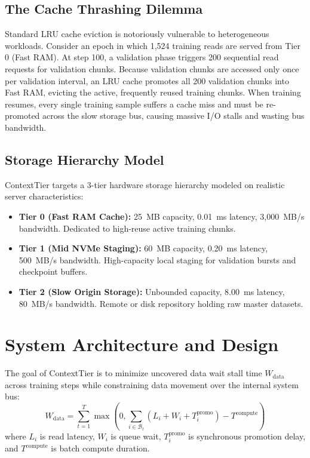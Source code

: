 \documentclass[conference]{IEEEtran}
\begin{document}
\subsection{The Cache Thrashing Dilemma}
Standard LRU cache eviction is notoriously vulnerable to heterogeneous workloads. Consider an epoch in which 1,524 training reads are served from Tier 0 (Fast RAM). At step 100, a validation phase triggers 200 sequential read requests for validation chunks. Because validation chunks are accessed only once per validation interval, an LRU cache promotes all 200 validation chunks into Fast RAM, evicting the active, frequently reused training chunks. When training resumes, every single training sample suffers a cache miss and must be re-promoted across the slow storage bus, causing massive I/O stalls and wasting bus bandwidth.

\subsection{Storage Hierarchy Model}
ContextTier targets a 3-tier hardware storage hierarchy modeled on realistic server characteristics:
\begin{itemize}
    \item \textbf{Tier 0 (Fast RAM Cache):} 25~MB capacity, 0.01~ms latency, 3,000~MB/s bandwidth. Dedicated to high-reuse active training chunks.
    \item \textbf{Tier 1 (Mid NVMe Staging):} 60~MB capacity, 0.20~ms latency, 500~MB/s bandwidth. High-capacity local staging for validation bursts and checkpoint buffers.
    \item \textbf{Tier 2 (Slow Origin Storage):} Unbounded capacity, 8.00~ms latency, 80~MB/s bandwidth. Remote or disk repository holding raw master datasets.
\end{itemize}

\section{System Architecture and Design}
\label{sec:design}

The goal of ContextTier is to minimize uncovered data wait stall time $W_{\text{data}}$ across training steps while constraining data movement over the internal system bus:
\begin{equation}
W_{\text{data}} = \sum_{t=1}^{T} \max\left(0, \sum_{i \in \mathcal{B}_t} (L_i + W_i + T^{\text{promo}}_i) - T^{\text{compute}} \right)
\end{equation}
where $L_i$ is read latency, $W_i$ is queue wait, $T^{\text{promo}}_i$ is synchronous promotion delay, and $T^{\text{compute}}$ is batch compute duration.
\end{document}
